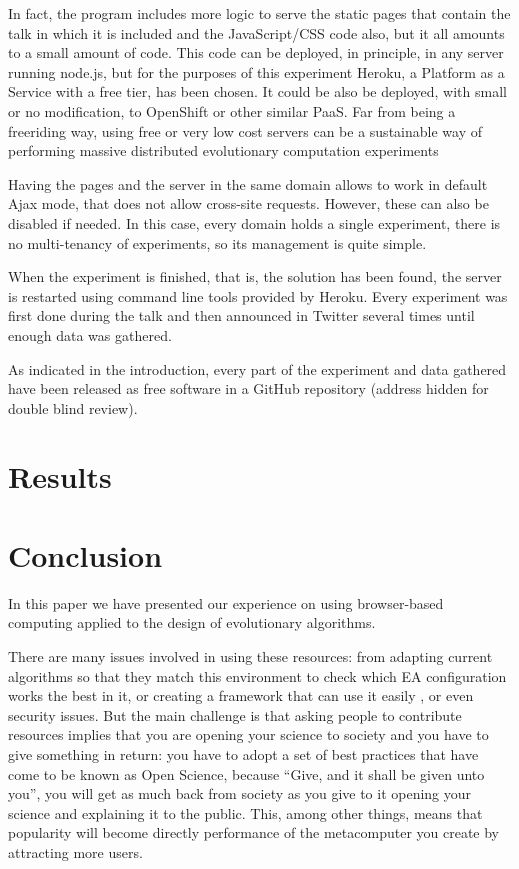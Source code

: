 \documentclass{sig-alternate}
\begin{document}
In fact, the program includes more logic to serve the static pages
that contain the talk in which it is included and the JavaScript/CSS
code also, but it all amounts to a small amount of code. This code can
be deployed, in principle, in any server running node.js, but for the
purposes of this experiment Heroku, a Platform as a Service with a
free tier, has been chosen. It could be also be deployed, with small
or no modification, to OpenShift or other similar PaaS. Far from being
a freeriding way, using free or very low cost servers can be a
sustainable way of performing massive distributed evolutionary
computation experiments \cite{Merelo2014}

Having the pages and the server in the same domain allows to work in
default Ajax mode, that does not allow cross-site requests. However,
these can also be disabled if needed. In this case, every domain holds
a single experiment, there is no multi-tenancy of experiments, so its
management is quite simple.

When the experiment is finished, that is, the solution has been found,
the server is restarted using  command line tools provided by
Heroku. Every experiment was first done during the talk and then
announced in Twitter several times until enough data was gathered.

As indicated in the introduction, every part of the experiment and
data gathered have been released as free software in a GitHub
repository (address hidden for double blind review).



\section{Results}
\label{sec:res}

\section{Conclusion}
\label{sec:conc}

In this paper we have presented our experience on using browser-based
computing applied
to the design of evolutionary algorithms.  

There are many issues involved in using these resources: from adapting current algorithms so that they match this environment \cite{agajaj} to check which EA configuration works the best in it, or creating a framework that can use it easily \cite{nodeo2014}, or even security issues. But the main challenge is that asking people to contribute resources implies that you are opening your science to society and you have to give something in return: you have to adopt a set of best practices that have come to be known as Open Science, because ``Give, and it shall be given unto you'', you will get as much back from society as you give to it opening your science and explaining it to the public. This, among other things, means that popularity will become directly performance of the metacomputer you create by attracting more users.




\end{document}
